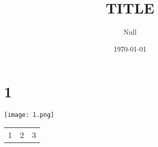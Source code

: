 \documentclass[UTF8]{ctexart}
\title{TITLE}
\author{Null}
\date{\today}
\begin{document}
    \maketitle
    \tableofcontents
    \section{1}
    
    
\begin{center}
    \texttt{[image: 1.png]}
\end{center}

\begin{tabular}{|c|c|c|}
    \hline
    1 & 2 & 3
\hline
\end{tabular}
\end{document}
